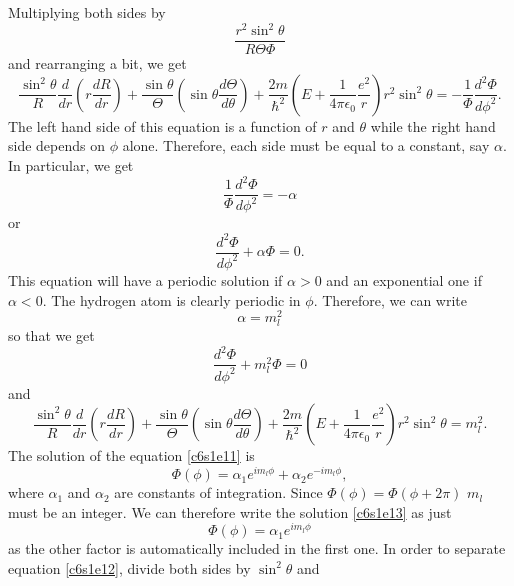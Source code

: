 Multiplying both sides by
\[
\frac{r^2\sin^2\theta}{R\Theta\Phi}
\]
and rearranging a bit, we get
\begin{equation}\label{c6s1e7}
\frac{\sin^2\theta}{R}\frac{d}{dr}\left(r\frac{dR}{dr}\right) +
\frac{\sin\theta}{\Theta}\left(\sin\theta\frac{d\Theta}{d\theta}\right) +
\frac{2m}{\hslash^2}\left(E + \frac{1}{4\pi\epsilon_0}\frac{e^2}{r}\right)
r^2\sin^2\theta =
-\frac{1}{\Phi}\frac{d^2\Phi}{d\phi^2}. 
\end{equation}
The left hand side of this equation is a function of $r$ and $\theta$ while
the right hand side depends on $\phi$ alone. Therefore, each side must be equal
to a constant, say $\alpha$. In particular, we get
\begin{equation}\label{c6s1e8}
\frac{1}{\Phi}\frac{d^2\Phi}{d\phi^2} = -\alpha
\end{equation}
or
\begin{equation}\label{c6s1e9}
\frac{d^2\Phi}{d\phi^2} + \alpha\Phi = 0.
\end{equation}
This equation will have a periodic solution if $\alpha > 0$ and an exponential
one if $\alpha < 0$. The hydrogen atom is clearly periodic in $\phi$. Therefore,
we can write
\begin{equation}\label{c6s1e10}
\alpha = m_l^2
\end{equation} 
so that we get
\begin{equation}\label{c6s1e11}
\frac{d^2\Phi}{d\phi^2} + m_l^2\Phi = 0
\end{equation}
and
\begin{equation}\label{c6s1e12}
\frac{\sin^2\theta}{R}\frac{d}{dr}\left(r\frac{dR}{dr}\right) +
\frac{\sin\theta}{\Theta}\left(\sin\theta\frac{d\Theta}{d\theta}\right) +
\frac{2m}{\hslash^2}\left(E + \frac{1}{4\pi\epsilon_0}\frac{e^2}{r}\right)
r^2\sin^2\theta = m_l^2.
\end{equation}
The solution of the equation \eqref{c6s1e11} is
\begin{equation}\label{c6s1e13}
\Phi(\phi) = \alpha_1 e^{im_l\phi} + \alpha_2 e^{-im_l\phi},
\end{equation}
where $\alpha_1$ and $\alpha_2$ are constants of integration. Since $\Phi(\phi)
= \Phi(\phi + 2\pi)$ $m_l$ must be an integer. We can therefore write the 
solution \eqref{c6s1e13} as just
\begin{equation}\label{c6s1e13}
\Phi(\phi) = \alpha_1 e^{im_l\phi}
\end{equation}
as the other factor is automatically included in the first one. In order to 
separate equation \eqref{c6s1e12}, divide both sides by $\sin^2\theta$ and
